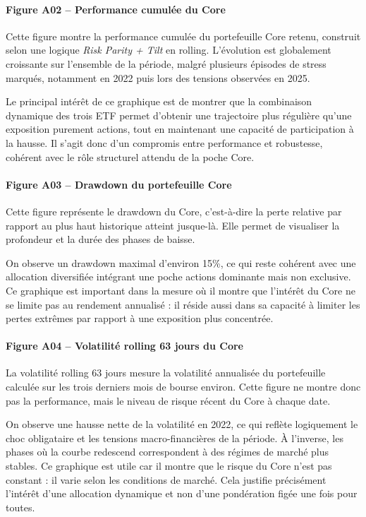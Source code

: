 \documentclass{article}
\begin{document}
\paragraph{Figure A02 -- Performance cumulée du Core}
Cette figure montre la performance cumulée du portefeuille Core retenu, construit selon une logique \textit{Risk Parity + Tilt} en rolling. L’évolution est globalement croissante sur l’ensemble de la période, malgré plusieurs épisodes de stress marqués, notamment en 2022 puis lors des tensions observées en 2025.

Le principal intérêt de ce graphique est de montrer que la combinaison dynamique des trois ETF permet d’obtenir une trajectoire plus régulière qu’une exposition purement actions, tout en maintenant une capacité de participation à la hausse. Il s’agit donc d’un compromis entre performance et robustesse, cohérent avec le rôle structurel attendu de la poche Core.

\paragraph{Figure A03 -- Drawdown du portefeuille Core}
Cette figure représente le drawdown du Core, c’est-à-dire la perte relative par rapport au plus haut historique atteint jusque-là. Elle permet de visualiser la profondeur et la durée des phases de baisse.

On observe un drawdown maximal d’environ 15\%, ce qui reste cohérent avec une allocation diversifiée intégrant une poche actions dominante mais non exclusive. Ce graphique est important dans la mesure où il montre que l’intérêt du Core ne se limite pas au rendement annualisé : il réside aussi dans sa capacité à limiter les pertes extrêmes par rapport à une exposition plus concentrée.

\paragraph{Figure A04 -- Volatilité rolling 63 jours du Core}
La volatilité rolling 63 jours mesure la volatilité annualisée du portefeuille calculée sur les trois derniers mois de bourse environ. Cette figure ne montre donc pas la performance, mais le niveau de risque récent du Core à chaque date.

On observe une hausse nette de la volatilité en 2022, ce qui reflète logiquement le choc obligataire et les tensions macro-financières de la période. À l’inverse, les phases où la courbe redescend correspondent à des régimes de marché plus stables. Ce graphique est utile car il montre que le risque du Core n’est pas constant : il varie selon les conditions de marché. Cela justifie précisément l’intérêt d’une allocation dynamique et non d’une pondération figée une fois pour toutes.
\end{document}
